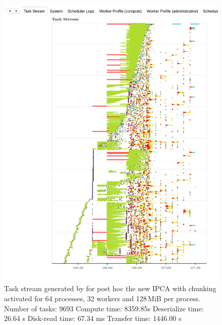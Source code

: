 \begin{figure}[h!]\centering
\includegraphics[width=\columnwidth]{figures/P64_W32_D128_DASK_ISIPCA.pdf}
\caption{Task stream generated by \dask for post hoc the new IPCA with chunking activated for 64 processes, 32 workers and 128\,MiB per process. 
    Number of tasks: 9693
    Compute time: 8359.85s
    Deserialize time: 26.64 s
    Disk-read time: 67.34 ms
    Transfer time: 1446.00 s
}
\label{fig:taskstreamdask3}
\end{figure}


